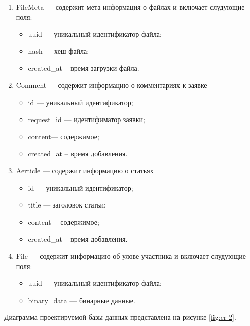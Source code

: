 \begin{enumerate}
	\item FileMeta --- содержит мета-информация о файлах и включает слудующие поля:
	\begin{itemize}[label=---]
		\item uuid --- уникальный идентификатор файла;
		\item hash --- хеш файла;
		\item created{\_}at -- время загрузки файла.
	\end{itemize}
	
	\item Comment --- содержит информацию о комментариях к заявке
	\begin{itemize}[label=---]
		\item id --- уникальный идентификатор;
		\item request{\_}id --- идентифиматор заявки;
		\item content--- содержимое;
		\item created{\_}at -- время добавления.
	\end{itemize}
	
	\item Aerticle --- содержит информацию о статьях
	\begin{itemize}[label=---]
		\item id --- уникальный идентификатор;
		\item title --- заголовок статьи;
		\item content--- содержимое;
		\item created{\_}at -- время добавления.
	\end{itemize}	
	
	\item File --- содержит информацию об улове участника и включает слудующие поля:
	\begin{itemize}[label=---]
		\item uuid --- уникальный идентификатор файла;
		\item binary{\_}data --- бинарные данные.
	\end{itemize}

\end{enumerate}

Диаграмма проектируемой базы данных представлена на рисунке \ref{fig:er-2}.

